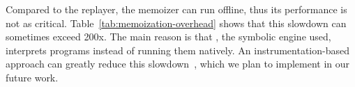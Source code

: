 

Compared to the replayer, the memoizer can run offline, thus its
performance is not as critical.  Table~\ref{tab:memoization-overhead}
shows that this slowdown can sometimes exceed 200x.  The main reason
is that \klee, the symbolic engine used, interprets programs instead of
running them natively.  An instrumentation-based approach can greatly
reduce this slowdown~\cite{cadar:exe:ccs06}, which we plan to implement in
our future work.  



